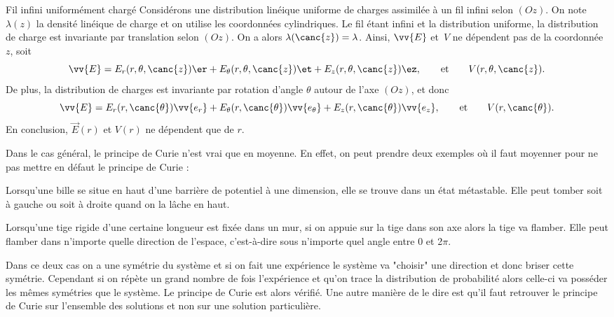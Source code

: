 \documentclass[12pt,fancy]{/Users/victor/Documents/COURS/2ACapECL/texmf/tex/latex/Preambles/cours}
\begin{document}
\begin{exemple}{Fil infini uniformément chargé}
Considérons une distribution linéique uniforme de charges assimilée à un fil infini selon $(Oz)$. On note $\lambda(z)$ la densité linéique de charge et on utilise les coordonnées cylindriques. Le fil étant infini et la distribution uniforme, la distribution de charge est invariante par translation selon $(Oz)$. On a alors $\lambda(\canc{z}) = \lambda$.
Ainsi, $\vv{E}$ et~$V$ ne dépendent pas de la coordonnée $z$, soit
\begin{equation*}
\vv{E}=E_r(r,\theta,\canc{z})\er+E_\theta(r,\theta,\canc{z})\et+E_z(r,\theta,\canc{z})\ez, \qquad \text{et} \qquad V(r,\theta,\canc{z}).
\end{equation*}
De plus, la distribution de charges est invariante par rotation d'angle $\theta$ autour de l'axe $(Oz)$, et donc
\begin{equation*}
\vv{E}=E_r(r,\canc{\theta})\vv{e_r}+E_\theta(r,\canc{\theta})\vv{e_\theta}+E_z(r,\canc{\theta})\vv{e_z}, \qquad \text{et} \qquad V(r,\canc{\theta}).
\end{equation*}
En conclusion, $\Vec{E}(r)$ et $V(r)$ ne dépendent que de $r$.

\end{exemple}

\begin{remarque}
Dans le cas général, le principe de Curie n'est vrai que en moyenne. En effet, on peut prendre deux exemples où il faut moyenner pour ne pas mettre en défaut le principe de Curie :
\begin{liste}
\item Lorsqu'une bille se situe en haut d'une barrière de potentiel à une dimension, elle se trouve dans un état métastable. Elle peut tomber soit à gauche ou soit à droite quand on la lâche en haut.
\item Lorsqu'une tige rigide d'une certaine longueur est fixée dans un mur, si on appuie sur la tige dans son axe alors la tige va flamber. Elle peut flamber dans n'importe quelle direction de l'espace, c'est-à-dire sous n'importe quel angle entre 0 et 2$\pi$.
\end{liste}
Dans ce deux cas on a une symétrie du système et si on fait une expérience le système va "choisir" une direction et donc briser cette symétrie. Cependant si on répète un grand nombre de fois l’expérience et qu’on trace la distribution de probabilité alors celle-ci va posséder les mêmes symétries que le système. Le principe de Curie est alors vérifié.
Une autre manière de le dire est qu’il faut retrouver le principe de Curie sur l’ensemble des solutions et non sur une solution particulière.
\end{remarque}
\end{document}
